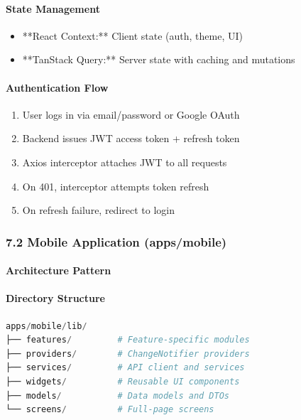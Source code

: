 \documentclass[11pt,a4paper]{article}
\begin{document}
\paragraph{State Management}

\begin{itemize}
\item **React Context:** Client state (auth, theme, UI)
\item **TanStack Query:** Server state with caching and mutations
\end{itemize}

\paragraph{Authentication Flow}

\begin{enumerate}
\item User logs in via email/password or Google OAuth
\item Backend issues JWT access token + refresh token
\item Axios interceptor attaches JWT to all requests
\item On 401, interceptor attempts token refresh
\item On refresh failure, redirect to login
\end{enumerate}

\subsubsection{7.2 Mobile Application (apps/mobile)}

\paragraph{Architecture Pattern}


\paragraph{Directory Structure}

\begin{lstlisting}[language=Python, caption=text code]
apps/mobile/lib/
├── features/         # Feature-specific modules
├── providers/        # ChangeNotifier providers
├── services/         # API client and services
├── widgets/          # Reusable UI components
├── models/           # Data models and DTOs
└── screens/          # Full-page screens
\end{lstlisting}
\end{document}
